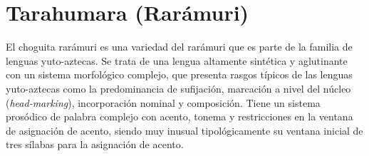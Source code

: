\section*{Tarahumara (Rarámuri)}

\noindent El choguita rarámuri es una variedad del rarámuri que es parte de la familia de lenguas yuto-aztecas. Se trata de una lengua altamente sintética y aglutinante con un sistema morfológico complejo, que presenta rasgos típicos de las lenguas yuto-aztecas como la predominancia de sufijación, marcación a nivel del núcleo (\textit{head-marking}), incorporación nominal y composición. Tiene un sistema prosódico de palabra complejo con acento, tonema y restricciones en la ventana de asignación de acento, siendo muy inusual tipológicamente su ventana inicial de tres sílabas para la asignación de acento. \vspace{0.5cm}

